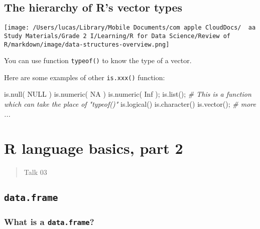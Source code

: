 \documentclass[
]{article}
\let\oldincludegraphics\includegraphics
\renewcommand{\includegraphics}[2][]{\begin{center}\oldincludegraphics[#1]{#2}\end{center}}
\newenvironment{Shaded}{}{}
\newcommand{\CommentTok}[1]{\textcolor[rgb]{0.38,0.63,0.69}{\textit{#1}}}
\newcommand{\ConstantTok}[1]{\textcolor[rgb]{0.53,0.00,0.00}{#1}}
\newcommand{\FunctionTok}[1]{\textcolor[rgb]{0.02,0.16,0.49}{#1}}
\newcommand{\NormalTok}[1]{#1}
\begin{document}
\hypertarget{the-hierarchy-of-rs-vector-types}{%
\subsection{The hierarchy of R's vector
types}\label{the-hierarchy-of-rs-vector-types}}

\texttt{[image: /Users/lucas/Library/Mobile Documents/com~apple~CloudDocs/~~aa Study Materials/Grade 2 I/Learning/R for Data Science/Review of R/markdown/image/data-structures-overview.png]}

You can use function \texttt{typeof()} to know the type of a vector.

Here are some examples of other \texttt{is.xxx()} function:

\begin{Shaded}
\begin{Highlighting}[]
\FunctionTok{is.null}\NormalTok{( }\ConstantTok{NULL}\NormalTok{ )}
\FunctionTok{is.numeric}\NormalTok{( }\ConstantTok{NA}\NormalTok{ )}
\FunctionTok{is.numeric}\NormalTok{( }\ConstantTok{Inf}\NormalTok{ );}
\FunctionTok{is.list}\NormalTok{(); }\CommentTok{\# This is a function which can take the place of "typeof()"}
\FunctionTok{is.logical}\NormalTok{()}
\FunctionTok{is.character}\NormalTok{()}
\FunctionTok{is.vector}\NormalTok{();}
\CommentTok{\# more ...}
\end{Highlighting}
\end{Shaded}

\hypertarget{r-language-basics-part-2}{%
\section{R language basics, part 2}\label{r-language-basics-part-2}}

\begin{quote}
Talk 03
\end{quote}

\hypertarget{dataframe}{%
\subsection{\texorpdfstring{\texttt{data.frame}}{data.frame}}\label{dataframe}}

\hypertarget{what-is-a-dataframe}{%
\subsubsection{\texorpdfstring{\textbf{What is a
\texttt{data.frame}?}}{What is a data.frame?}}\label{what-is-a-dataframe}}
\end{document}
